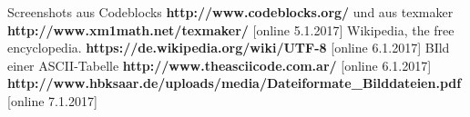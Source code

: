  Screenshots aus Codeblocks \textbf{http://www.codeblocks.org/} und aus texmaker \textbf{http://www.xm1math.net/texmaker/} [online 5.1.2017]
 Wikipedia, the free encyclopedia. \textbf{https://de.wikipedia.org/wiki/UTF-8} [online 6.1.2017]
 BIld einer ASCII-Tabelle \textbf{http://www.theasciicode.com.ar/} [online 6.1.2017]
 \textbf{http://www.hbksaar.de/uploads/media/Dateiformate\_Bilddateien.pdf} [online 7.1.2017]